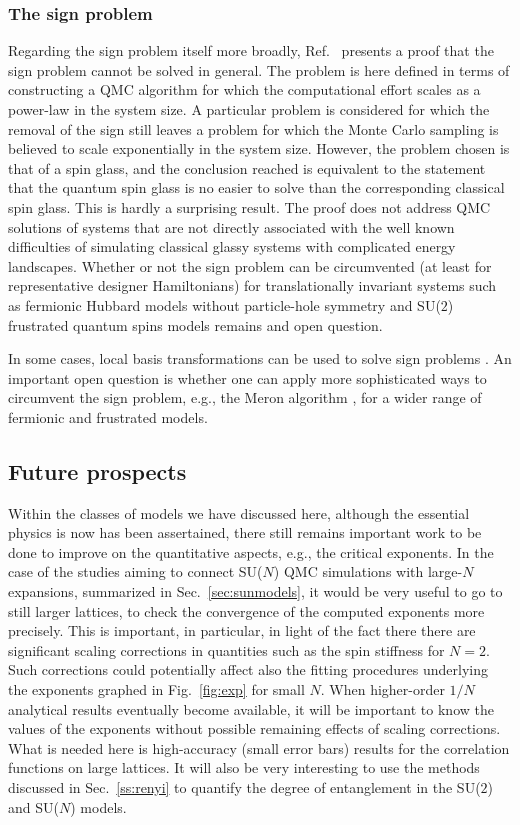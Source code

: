 \documentclass[range]{ar2e}
\begin{document}
\subsubsection{The sign problem}

Regarding the sign problem itself more broadly, Ref.~\cite{Troyer05} presents a proof that the sign problem cannot be solved in general. 
The problem is here defined in terms of constructing a QMC algorithm for which the computational effort scales as a power-law in the system
size. A particular problem is considered for which the removal of the sign still leaves a problem for which the Monte Carlo sampling is believed 
to scale exponentially in the system size. However, the problem chosen is that of a spin glass, and the conclusion reached is equivalent to
the statement that the quantum spin glass is no easier to solve than the corresponding classical spin glass. This is hardly a surprising result. 
The proof does not address QMC solutions of systems that are not directly associated with the well known difficulties of simulating 
classical glassy systems with complicated energy landscapes. Whether or not the sign problem can be circumvented (at least for representative 
designer Hamiltonians) for translationally invariant systems such as fermionic Hubbard models without particle-hole symmetry and SU($2$) frustrated 
quantum spins models remains and open question.

In some cases, local basis transformations can be used to solve sign problems \cite{Nakamura97}. An important open question is whether one 
can apply more sophisticated ways to circumvent the sign problem, e.g., the Meron algorithm \cite{Chandrasekharan99}, for a wider range 
of fermionic and frustrated  models.

\subsection{Future prospects}

Within the classes of models we have discussed here, although the essential physics is now has been assertained, there still remains
important work to be done to improve on the quantitative aspects, e.g., the critical exponents. In the case of the studies aiming to connect
SU($N$) QMC simulations with large-$N$ expansions, summarized in Sec.~\ref{sec:sunmodels}, it would be very useful to go to still larger lattices, 
to check the convergence of the computed exponents more precisely. This is important, in particular, in light of the fact there there are significant scaling 
corrections in quantities such as the spin stiffness for $N=2$. Such corrections could potentially affect also the fitting procedures underlying 
the exponents graphed in Fig.~\ref{fig:exp} for small $N$. When higher-order $1/N$ analytical results eventually become available, it will be important to know 
the values of the exponents without possible remaining effects of scaling corrections. What is needed here is high-accuracy (small error bars) 
results for the correlation functions on large lattices. It will also be very interesting to use the methods discussed in Sec.~\ref{ss:renyi} to quantify 
the degree of entanglement in the SU($2$) and SU($N$) models.
\end{document}
